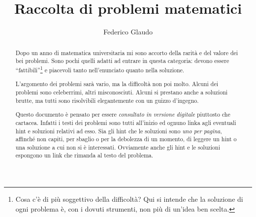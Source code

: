 \documentclass[a4paper,12pt]{article}
\title{Raccolta di problemi matematici}
\author{Federico Glaudo}
\newcounter{ProblemNumber}
\begin{document}
\maketitle

\begin{abstract}
	Dopo un anno di matematica universitaria mi sono accorto della rarità e del valore dei bei problemi. Sono pochi quelli adatti ad entrare in questa categoria: devono essere ``fattibili''\footnote{Cosa c'è di più soggettivo della difficoltà? Qui si intende che la soluzione di ogni problema è, con i dovuti strumenti, non più di un'idea ben scelta.} e piacevoli tanto nell'enunciato quanto nella soluzione.
	
	L'argomento dei problemi sarà vario, ma la difficoltà non poi molto. Alcuni dei problemi sono celeberrimi, altri misconosciuti. Alcuni si prestano anche a soluzioni brutte, ma tutti sono risolvibili elegantemente con un guizzo d'ingegno.
	
	Questo documento è pensato per essere \emph{consultato in versione digitale} piuttosto che cartacea. 
	Infatti i testi dei problemi sono tutti all'inizio ed ognuno linka agli eventuali hint e soluzioni relativi ad esso. Sia gli hint che le soluzioni sono \emph{uno per pagina}, affinché non capiti, per sbaglio o per la debolezza di un momento, di leggere un hint o una soluzione a cui non si è interessati. Ovviamente anche gli hint e le soluzioni espongono un link che rimanda al testo del problema. 
\end{abstract}
\clearpage

\tableofcontents
\clearpage




%
\addtocounter{ProblemNumber}{1}%
%
%
%
\end{document}
